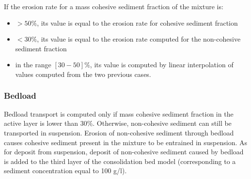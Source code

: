 If the erosion rate for a mass cohesive sediment fraction of the mixture is:
\begin{itemize}
\item  $>50\%$, its value is equal to the erosion rate for cohesive sediment fraction
\item $<30\%$, its value is equal to the erosion rate computed for the non-cohesive sediment fraction
\item in the range $[30-50]\%$, its value is computed by linear interpolation of values computed from the two previous cases.
\end{itemize}


\subsubsection{Bedload}
Bedload transport is computed only if mass cohesive sediment fraction in the active layer is lower than 30\%. Otherwise, non-cohesive sediment can still be transported in suspension. Erosion of non-cohesive sediment through bedload causes cohesive sediment present in the mixture to be entrained in suspension. As for deposit from suspension, deposit of non-cohesive sediment caused by bedload is added to the third layer of the consolidation bed model (corresponding to a sediment concentration equal to 100 g/l).






